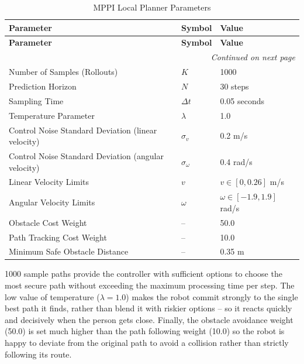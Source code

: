 \begin{longtable}{|p{5cm}|p{2.5cm}|p{6cm}|}
	\caption{MPPI Local Planner Parameters}
	\label{tab:mppi_parameters} \\
	
	\hline
	\textbf{Parameter} & \textbf{Symbol} & \textbf{Value} \\
	\hline
	\endfirsthead
	
	\hline
	\textbf{Parameter} & \textbf{Symbol} & \textbf{Value} \\
	\hline
	\endhead
	
	\hline
	\multicolumn{3}{r}{\textit{Continued on next page}} \\
	\hline
	\endfoot
	
	\hline
	\endlastfoot
	
	Number of Samples (Rollouts) &
	$K$ &
	1000 \\
	\hline
	
	Prediction Horizon &
	$N$ &
	30 steps \\
	\hline
	
	Sampling Time &
	$\Delta t$ &
	0.05 seconds \\
	\hline
	
	Temperature Parameter &
	$\lambda$ &
	1.0 \\
	\hline
	
	Control Noise Standard Deviation (linear velocity) &
	$\sigma_v$ &
	0.2 m/s \\
	\hline
	
	Control Noise Standard Deviation (angular velocity) &
	$\sigma_\omega$ &
	0.4 rad/s \\
	\hline
	
	Linear Velocity Limits &
	$v$ &
	$v \in [0,0.26]$ m/s \\
	\hline
	
	Angular Velocity Limits &
	$\omega$ &
	$\omega \in [-1.9,1.9]$ rad/s \\
	\hline
	
	Obstacle Cost Weight &
	-- &
	50.0 \\
	\hline
	
	Path Tracking Cost Weight &
	-- &
	10.0 \\
	\hline
	
	Minimum Safe Obstacle Distance &
	-- &
	0.35 m \\
	\hline
	
\end{longtable}
1000 sample paths provide the controller with sufficient options to choose the most secure path without exceeding the maximum processing time per step. The low value of temperature ($\lambda=1.0$) makes the robot commit strongly to the single best path it finds, rather than blend it with riskier options -- so it reacts quickly and decisively when the person gets close. Finally, the obstacle avoidance weight (50.0) is set much higher than the path following weight (10.0) so the robot is happy to deviate from the original path to avoid a collision rather than strictly following its route.

